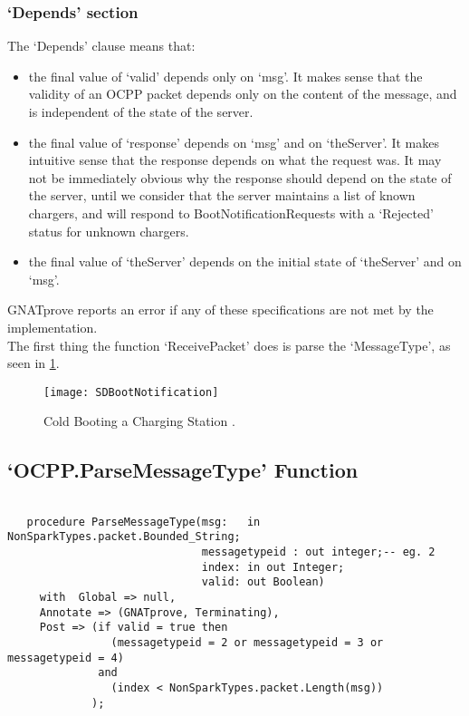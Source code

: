 \documentclass[12pt,openany,a4paper]{book}
\begin{document}
\subsubsection{`Depends' section}
The `Depends' clause means that:
\begin{itemize}
\item the final value of `valid' depends only on `msg'. It makes sense that the validity of an OCPP packet depends only on the content of the message, and is independent of the state of the server.
\item the final value of `response' depends on `msg' and on `theServer'. It makes intuitive sense that the response depends on what the request was. It may not be immediately obvious why the response should depend on the state of the server, until we consider that the server maintains a list of known chargers, and will respond to BootNotificationRequests with a `Rejected' status for unknown chargers.
\item the final value of `theServer' depends on the initial state of `theServer' and on `msg'. 
\end{itemize}

GNATprove reports an error if any of these specifications are not met by the implementation.\\


The first thing the function `ReceivePacket' does is parse the `MessageType', as seen in \ref{fig:SDBootNotification}. 

	\begin{center}
		\begin{figure}[H]
			\texttt{[image: SDBootNotification]}
			\caption{Cold Booting a Charging Station \cite{ocpp2b}.}
			\label{fig:SDBootNotification}
		\end{figure}
	\end{center}

\pagebreak
\subsection{`OCPP.ParseMessageType' Function}
\begin{verbatim}

   procedure ParseMessageType(msg:   in  NonSparkTypes.packet.Bounded_String;
                              messagetypeid : out integer;-- eg. 2
                              index: in out Integer;
                              valid: out Boolean)
     with  Global => null,
     Annotate => (GNATprove, Terminating),
     Post => (if valid = true then 
                (messagetypeid = 2 or messagetypeid = 3 or messagetypeid = 4)
              and
                (index < NonSparkTypes.packet.Length(msg))
             );
\end{verbatim}
\end{document}
